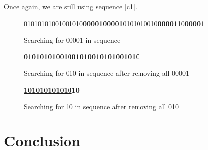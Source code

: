 \documentclass[10pt,letterpaper,notitlepage,draft]{article}
\theoremstyle{definition}
\begin{document}
Once again, we are still using sequence \ref{c1}. 

\begin{figure}[h!]
\begin{center}
01010101001001\underline{010}{\bf\underline{00001}}{\bf00001}0101010\underline{010}{\bf00001}\underline{10}{\bf00001}
\end{center}
\caption{Searching for 00001 in sequence}\label{c4}
\end{figure}

\begin{figure}[h!]
\begin{center}
{\bf 0101010\underline{10}\underline{010}010\underline{10}01010\underline{10}01010}
\end{center}
\caption{Searching for 010 in sequence after removing all 00001}\label{c5}
\end{figure}

\begin{figure}[h!]
\begin{center}
{\bf \underline{101010101010}10}
\end{center}
\caption{Searching for 10 in sequence after removing all 010}\label{c6}
\end{figure}


\section{Conclusion}

\nocite{*}

%
% 

\end{document}
